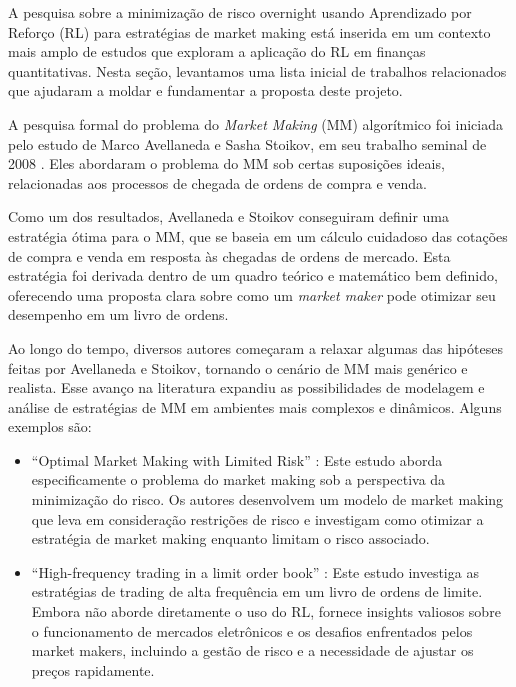 A pesquisa sobre a minimização de risco overnight usando Aprendizado por Reforço (RL) para estratégias de market making está inserida em um contexto mais amplo de estudos que exploram a aplicação do RL em finanças quantitativas. Nesta seção, levantamos uma lista inicial de trabalhos relacionados que ajudaram a moldar e fundamentar a proposta deste projeto.

A pesquisa formal do problema do \textit{Market Making} (MM) algorítmico foi iniciada pelo estudo de Marco Avellaneda e Sasha Stoikov, em seu trabalho seminal de 2008 \citep{Avellaneda2008}. Eles abordaram o problema do MM sob certas suposições ideais, relacionadas aos processos de chegada de ordens de compra e venda.

Como um dos resultados, Avellaneda e Stoikov conseguiram definir uma estratégia ótima para o MM, que se baseia em um cálculo cuidadoso das cotações de compra e venda em resposta às chegadas de ordens de mercado. Esta estratégia foi derivada dentro de um quadro teórico e matemático bem definido, oferecendo uma proposta clara sobre como um \textit{market maker} pode otimizar seu desempenho em um livro de ordens.

Ao longo do tempo, diversos autores começaram a relaxar algumas das hipóteses feitas por Avellaneda e Stoikov, tornando o cenário de MM mais genérico e realista. Esse avanço na literatura expandiu as possibilidades de modelagem e análise de estratégias de MM em ambientes mais complexos e dinâmicos. Alguns exemplos são:
\begin{itemize}
    \item ``Optimal Market Making with Limited Risk'' \citep{Gueant2017}: Este estudo aborda especificamente o problema do market making sob a perspectiva da minimização do risco. Os autores desenvolvem um modelo de market making que leva em consideração restrições de risco e investigam como otimizar a estratégia de market making enquanto limitam o risco associado.
    \item ``High-frequency trading in a limit order book'' \citep{Avellaneda2008}: Este estudo investiga as estratégias de trading de alta frequência em um livro de ordens de limite. Embora não aborde diretamente o uso do RL, fornece insights valiosos sobre o funcionamento de mercados eletrônicos e os desafios enfrentados pelos market makers, incluindo a gestão de risco e a necessidade de ajustar os preços rapidamente.
\end{itemize}

